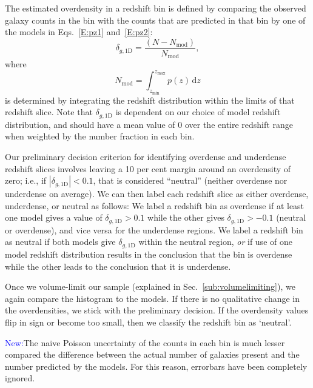 \documentclass[twocolumn,useAMS,usenatbib]{mn2e}
\newcommand{\rachel}[1]{{\textcolor{red}{#1}}}
\newcommand{\arun}[1]{{\textcolor{blue}{#1}}}
\begin{document}
The estimated overdensity in a redshift bin is defined by comparing
the observed galaxy counts in the bin with the counts that are
predicted in that bin by one of the models in Eqs.~\eqref{E:pz1}
and~\eqref{E:pz2}:
\begin{equation}
\delta_{g,\text{1D}}=\frac{(N-N_{\text{mod}})}{N_{\text{mod}}},
\end{equation}
where
\begin{equation}
N_\text{mod} = \int_{z_\text{min}}^{z_\text{max}} p(z) \,\mathrm{d}z
\end{equation}
is determined by integrating the redshift distribution within the
limits of that redshift slice. 
Note that $\delta_{g,\text{1D}}$ is dependent on our choice of model
redshift distribution, and should have a mean value of $0$ over the
entire redshift range when weighted by the number fraction in each bin.

Our preliminary decision criterion for identifying overdense and underdense
redshift slices involves leaving a 10 per cent margin around an
overdensity of zero; i.e., if $\left| \delta_{g,\text{1D}} \right| <
0.1$, that is considered ``neutral'' (neither overdense nor
underdense on average).  We can then label each redshift slice as
either overdense, underdense, or neutral as follows: 
We label a redshift bin as overdense if at least one model gives a
value of $\delta_{g,\text{1D}} > 0.1$ while the other gives
$\delta_{g,\text{1D}} > -0.1$ 
(neutral or overdense), and vice versa for the underdense regions. We
label a redshift bin as neutral if both models give
$\delta_{g,\text{1D}}$ within the neutral region,  
\emph{or} if use of one model redshift distribution results in the
conclusion that the bin is overdense while the other leads to the
conclusion that it is underdense. 

Once we volume-limit our sample (explained in Sec.~\ref{sub:volumelimiting}), we again compare the histogram to the models.
If there is no qualitative change in the overdensities, we stick with the preliminary decision. If the overdensity values
flip in sign or become too small, then we classify the redshift bin as `neutral'.

\arun{New:}The naive Poisson uncertainty of the counts
in each bin is much lesser compared the difference between the actual number of galaxies present
and the number predicted by the models. For this reason, errorbars have been completely ignored.
\end{document}
